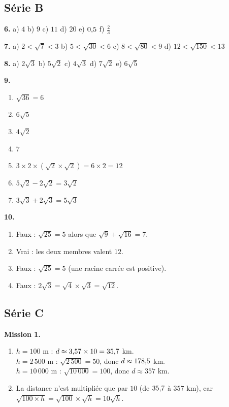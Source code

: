 \documentclass[../main.tex]{subfiles}
\begin{document}
\subsection*{Série B}

\textbf{6.} a) $4$ \quad b) $9$ \quad c) $11$ \quad d) $20$ \quad e) $0{,} 5$ \quad f) $\frac{2}{3}$

\textbf{7.} a) $2 < \sqrt{7} < 3$ \quad b) $5 < \sqrt{30} < 6$ \quad c) $8 < \sqrt{80} < 9$ \quad d) $12 < \sqrt{150} < 13$

\textbf{8.} a) $2\sqrt{3}$ \quad b) $5\sqrt{2}$ \quad c) $4\sqrt{3}$ \quad d) $7\sqrt{2}$ \quad e) $6\sqrt{5}$

\textbf{9.}
\begin{enumerate}[label=\alph*)]
  \item $\sqrt{36} = 6$
  \item $6\sqrt{5}$
  \item $4\sqrt{2}$
  \item $7$
  \item $3 \times 2 \times (\sqrt{2}\times\sqrt{2}) = 6 \times 2 = 12$
  \item $5\sqrt{2} - 2\sqrt{2} = 3\sqrt{2}$
  \item $3\sqrt{3} + 2\sqrt{3} = 5\sqrt{3}$
\end{enumerate}

\textbf{10.}
\begin{enumerate}[label=\alph*)]
  \item Faux : $\sqrt{25} = 5$ alors que $\sqrt{9}+\sqrt{16} = 7$.
  \item Vrai : les deux membres valent $12$.
  \item Faux : $\sqrt{25} = 5$ (une racine carrée est positive).
  \item Faux : $2\sqrt{3} = \sqrt{4}\times\sqrt{3} = \sqrt{12}$.
\end{enumerate}

\subsection*{Série C}

\textbf{Mission 1.}
\begin{enumerate}[label=\alph*)]
  \item $h = 100$ m : $d \approx 3{,} 57 \times 10 = 35{,} 7$ km. \\
        $h = 2\,500$ m : $\sqrt{2\,500} = 50$, donc $d \approx 178{,} 5$ km. \\
        $h = 10\,000$ m : $\sqrt{10\,000} = 100$, donc $d \approx 357$ km.
  \item La distance n'est multipliée que par $10$ (de $35{,} 7$ à $357$ km), car $\sqrt{100 \times h} = \sqrt{100}\times\sqrt{h} = 10\sqrt{h}$.
\end{enumerate}
\end{document}
